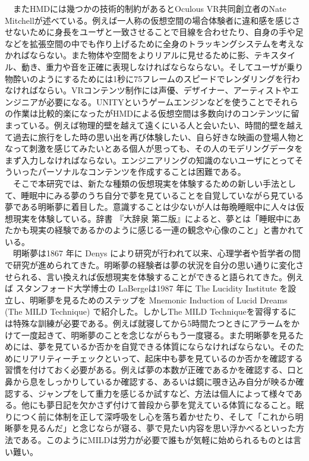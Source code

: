 　またHMDには幾つかの技術的制約があるとOculous VR共同創立者のNate Mitchellが述べている\cite{oculus}。例えば一人称の仮想空間の場合体験者に違和感を感じさせないために身長をユーザと一致させることで目線を合わせたり、自身の手や足などを拡張空間の中でも作り上げるために全身のトラッキングシステムを考えなかればならない。また物体や空間をよりリアルに見せるために影、テキスタイル、動き、重力や音を正確に表現しなければならならない\cite{vrtrendShiny}。そしてユーザが乗り物酔いのようにするためには1秒に75フレームのスピードでレンダリングを行わなければならい\cite{HMDifficulties}。VRコンテンツ制作には声優、デザイナー、アーティストやエンジニアが必要になる。UNITYというゲームエンジンなどを使うことでそれらの作業は比較的楽になったがHMDによる仮想空間は多数向けのコンテンツに留まっている。例えば物理的壁を越えて遠くにいる人と会いたい、時間的壁を越えて過去に旅行をした時の思い出を再び体験したい、自ら好きな映画の登場人物となって刺激を感じてみたいとある個人が思っても、その人のモデリングデータをまず入力しなければならない。エンジニアリングの知識のないユーザにとってそういったパーソナルなコンテンツを作成することは困難である。\\
　そこで本研究では、新たな種類の仮想現実を体験するための新しい手法として、睡眠中にみる夢のうち自分で夢を見ていることを自覚していながら見ている夢である明晰夢に着目した。意識することは少ないが人は毎晩睡眠中に人々は仮想現実を体験している。辞書 『大辞泉 第二版』によると、夢とは「睡眠中にあたかも現実の経験であるかのように感じる一連の観念や心像のこと」\cite{dream}と書かれている。\\
　明晰夢は1867 年に Denys により研究が行われて以来\cite{saintDenys}、心理学者や哲学者の間で研究が進められてきた。明晰夢の経験者は夢の状況を自分の思い通りに変化させられる、言い換えれば仮想現実を体験することができると語られてきた。例えば スタンフォード大学博士の LaBergeは1987 年に The Lucidity Institute を設立し、明晰夢を見るためのステップを Mnemonic Induction of Lucid Dreams (The MILD Technique) で紹介した\cite{LaBerge}。しかしThe MILD Techniqueを習得するには特殊な訓練が必要である。例えば就寝してから5時間たつときにアラームをかけて一度起きて、明晰夢のことを念じながらもう一度寝る。また明晰夢を見るためには、夢を見ているか否かを自覚できる体質にならなければならない。そのためにリアリティーチェックといって、起床中も夢を見ているのか否かを確認する習慣を付けておく必要がある。例えば夢の本数が正確であるかを確認する、口と鼻から息をしっかりしているか確認する、あるいは鏡に覗き込み自分が映るか確認する、ジャンプをして重力を感じるか試すなど、方法は個人によって様々である。他にも夢日記を欠かさず付けて普段から夢を覚えている体質になること。眠りにつく前に体制を正して深呼吸をし心を落ち着かせたり、そして「これから明晰夢を見るんだ」と念じならが寝る、夢で見たい内容を思い浮かべるといった方法である。このようにMILDは労力が必要で誰もが気軽に始められるものとは言い難い。
